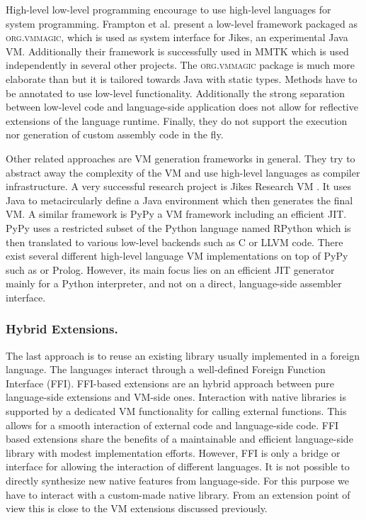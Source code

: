High-level low-level programming \cite{Fram09a} encourage to use high-level languages for system programming.
Frampton et al. present a low-level framework packaged as \textsc{org.vmmagic}, which is used as system interface for Jikes, an experimental Java VM.
Additionally their framework is successfully used in MMTK \cite{Blac04a} which is used independently in several other projects.
The \textsc{org.vmmagic} package is much more elaborate than \B but it is tailored towards Java with static types.
Methods have to be annotated to use low-level functionality.
Additionally the strong separation between low-level code and language-side application does not allow for reflective extensions of the language runtime.
Finally, they do not support the execution nor generation of custom assembly code in the fly.

Other related approaches are VM generation frameworks in general.
They try to abstract away the complexity of the VM and use high-level languages as compiler infrastructure.
A very successful research project is Jikes Research VM \cite{Jikes}.
It uses Java to metacircularly define a Java environment which then generates the final VM.
A similar framework is PyPy \cite{Rigo06a} a VM framework including an efficient JIT. 
PyPy uses a restricted subset of the Python language named RPython which is then translated to various low-level backends such as C or LLVM code.
There exist several different high-level language VM implementations on top of PyPy such as \ST \cite{Bolz08a} or Prolog.
However, its main focus lies on an efficient JIT generator mainly for a Python interpreter, and not on a direct, language-side assembler interface.


\subsubsection{Hybrid Extensions.}
The last approach is to reuse an existing library usually implemented in a foreign language.
The languages interact through a well-defined Foreign Function Interface (FFI).
FFI-based extensions are an hybrid approach between pure language-side extensions and VM-side ones.
Interaction with native libraries is supported by a dedicated VM functionality for calling external functions.
This allows for a smooth interaction of external code and language-side code.
FFI based extensions share the benefits of a maintainable and efficient language-side library with modest implementation efforts.
However, FFI is only a bridge or interface for allowing the interaction of different languages. 
It is not possible to directly synthesize new native features from language-side.
For this purpose we have to interact with a custom-made native library.
From an extension point of view this is close to the VM extensions discussed previously.

